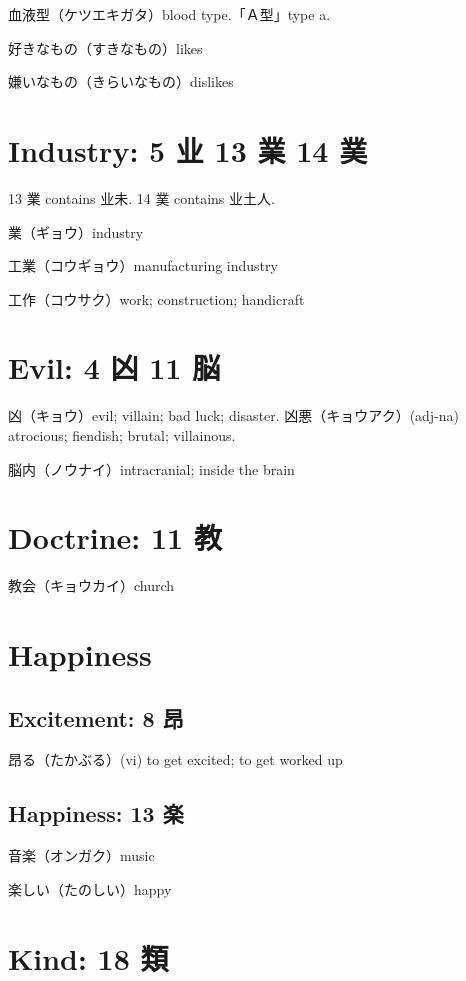 血液型（ケツエキガタ）blood type.「Ａ型」type a.

好きなもの（すきなもの）likes

嫌いなもの（きらいなもの）dislikes

\section{Industry: 5 业 13 業 14 菐}

13 業 contains 业未.
14 菐 contains 业土人.

業（ギョウ）industry

工業（コウギョウ）manufacturing industry

工作（コウサク）work; construction; handicraft

\section{Evil: 4 凶 11 脳}

凶（キョウ）evil; villain; bad luck; disaster.
凶悪（キョウアク）(adj-na) atrocious; fiendish; brutal; villainous.

脳内（ノウナイ）intracranial; inside the brain

\section{Doctrine: 11 教}

教会（キョウカイ）church

\section{Happiness}

\subsection{Excitement: 8 昂}

昂る（たかぶる）(vi) to get excited; to get worked up

\subsection{Happiness: 13 楽}

音楽（オンガク）music

楽しい（たのしい）happy

\section{Kind: 18 類}

